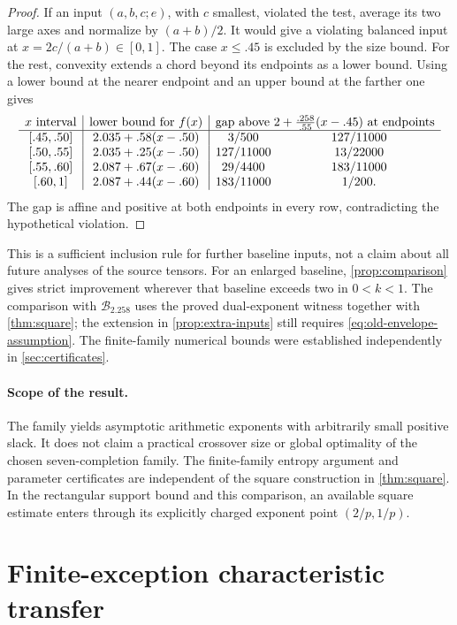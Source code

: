 \documentclass[11pt]{article}
\numberwithin{equation}{section}
\theoremstyle{definition}
\theoremstyle{remark}
\begin{document}
\begin{proof}
If an input \((a,b,c;e)\), with \(c\) smallest, violated the test,
average its two large axes and normalize by \((a+b)/2\).
It would give a violating balanced input at
\(x=2c/(a+b)\in[0,1]\).
The case \(x\le.45\) is excluded by the size bound.
For the rest, convexity extends a chord beyond its endpoints as
a lower bound.
Using a lower bound at the nearer endpoint and an upper bound at
the farther one gives
\[
\begin{array}{c|c|cc}
x\text{ interval}&\text{lower bound for }f(x)&
 \multicolumn{2}{c}{\text{gap above }2+\frac{.258}{.55}(x-.45)
                   \text{ at endpoints}}\\ \hline
{[.45,.50]}&2.035+.58(x-.50)&3/500&127/11000\\
{[.50,.55]}&2.035+.25(x-.50)&127/11000&13/22000\\
{[.55,.60]}&2.087+.67(x-.60)&29/4400&183/11000\\
{[.60,1]}&2.087+.44(x-.60)&183/11000&1/200 .
\end{array}
\]
The gap is affine and positive at both endpoints in every row,
contradicting the hypothetical violation.
\end{proof}

This is a sufficient inclusion rule for further baseline inputs, not
a claim about all future analyses of the source tensors.
For an enlarged baseline, \cref{prop:comparison} gives strict
improvement wherever that baseline exceeds two in \(0<k<1\).
The comparison with \(\mathcal B_{2.258}\) uses the proved
dual-exponent witness together with \cref{thm:square};
the extension in \cref{prop:extra-inputs} still requires
\eqref{eq:old-envelope-assumption}.
The finite-family numerical bounds were established independently
in \cref{sec:certificates}.

\paragraph{Scope of the result.}
The family yields asymptotic arithmetic exponents with arbitrarily
small positive slack.  It does not claim a practical crossover size
or global optimality of the chosen seven-completion family.
The finite-family entropy argument and parameter certificates are
independent of the square construction in \cref{thm:square}.
In the rectangular support bound and this comparison, an available
square estimate enters through its explicitly charged exponent point
\((2/p,1/p)\).

\section{Finite-exception characteristic transfer}\label{sec:characteristic-transfer}
\end{document}
